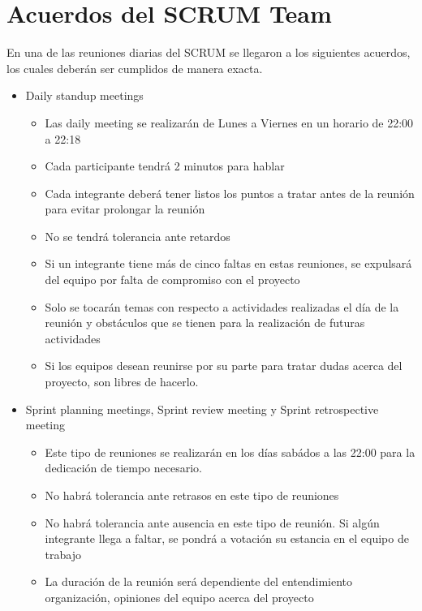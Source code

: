\documentclass[12pt,letterpaper]{article}
\begin{document}
    \section{Acuerdos del SCRUM Team}
    \justify
                En una de las reuniones diarias del SCRUM se llegaron a
                los siguientes acuerdos, los cuales deberán ser cumplidos de 
                manera exacta.
                \begin{itemize}
                    \item Daily standup meetings
                    \begin{itemize}
                        \item Las daily meeting se realizarán de Lunes a Viernes en un horario de 22:00 a 22:18 
                        \item Cada participante tendrá 2 minutos para hablar
                        \item Cada integrante deberá tener listos los puntos a tratar antes de la reunión para evitar prolongar la reunión
                        \item No se tendrá tolerancia ante retardos
                        \item Si un integrante tiene más de cinco faltas en estas reuniones, se expulsará del equipo por falta de compromiso con el proyecto
                        \item Solo se tocarán temas con respecto a actividades realizadas el día de la reunión y obstáculos que se tienen para la realización de futuras actividades
                        \item Si los equipos desean reunirse por su parte para tratar dudas acerca del proyecto, son libres de hacerlo.
                    \end{itemize}
                    \item Sprint planning meetings, Sprint review meeting y Sprint retrospective meeting
                    \begin{itemize}
                        \item Este tipo de reuniones se realizarán en los días sabádos a las 22:00 para la dedicación de tiempo necesario.
                        \item No habrá tolerancia ante retrasos en este tipo de reuniones
                        \item No habrá tolerancia ante ausencia en este tipo de reunión. Si algún integrante llega a faltar, se pondrá a votación su estancia en el equipo de trabajo 
                        \item La duración de la reunión será dependiente del entendimiento organización, opiniones del equipo acerca del proyecto 
                    \end{itemize}
                \end{itemize}
\end{document}
